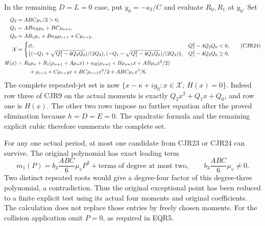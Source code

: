 \documentclass[11pt]{article}
\begin{document}
In the remaining $D=L=0$ case, put $y_0=-a_I/C$ and evaluate
$R_0,R_1$ at $y_0$. Set
\[
\begin{split}
 Q_2&=ABC\mu_v/2>0,\\
 Q_1&=ABa_R\mu_v+BC\mu_{v+1},\\
 Q_0&=AR_1\mu_v+Ba_R\mu_{v+1}+C\mu_{v+2},\\
 \mathcal X&=\begin{cases}
 \varnothing,&Q_1^2-4Q_2Q_0<0,\\
 \{(-Q_1+\sqrt{Q_1^2-4Q_2Q_0})/(2Q_2),
   (-Q_1-\sqrt{Q_1^2-4Q_2Q_0})/(2Q_2)\},&Q_1^2-4Q_2Q_0\ge0,
 \end{cases}\\
 H(x)&=R_0\mu_v+R_1(\mu_{v+1}+A\mu_vx)
       +a_R(\mu_{v+2}+B\mu_{v+1}x+AB\mu_vx^2/2)\\
 &\hspace{8mm}+\mu_{v+3}+C\mu_{v+2}x+
                 BC\mu_{v+1}x^2/2+ABC\mu_vx^3/6.
\end{split}\tag{CJR24}
\]
The complete repeated-jet set is now
$\{x-\kappa+iy_0:x\in\mathcal X,\ H(x)=0\}$.
Indeed row three of CJR9 on the actual moments is exactly
$Q_2x^2+Q_1x+Q_0$, and row one is $H(x)$.
The other two rows impose no further equation after the proved
elimination because $h=D=E=0$. The quadratic formula and the
remaining explicit cubic therefore enumerate the complete set.

For any one actual period, at most one candidate from CJR23 or
CJR24 can survive. The original polynomial has exact leading term
\[
 m_1(P)=b_3\frac{ABC}{6}\mu_vP^3+
                         \text{terms of degree at most two},
 \qquad b_3\frac{ABC}{6}\mu_v\ne0.
 \tag{CJR25}
\]
Two distinct repeated roots would give a degree-four factor of
this degree-three polynomial, a contradiction. Thus the original
exceptional point has been reduced to a finite explicit test using
its actual four moments and original coefficients. The calculation
does not replace those entries by freely chosen moments. For the
collision application omit $P=0$, as required in EQR5.
\end{document}
